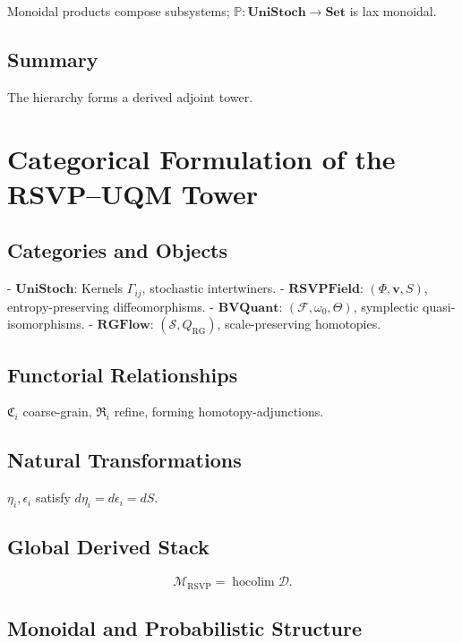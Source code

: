 \documentclass[12pt]{article}
\begin{document}
Monoidal products compose subsystems; \(\mathbb{P}: \mathbf{UniStoch} \to \mathbf{Set}\) is lax monoidal.

\subsection{Summary}

The hierarchy forms a derived adjoint tower.

\section{Categorical Formulation of the RSVP–UQM Tower}
\label{app:categorical-tower}

\subsection{Categories and Objects}

- \(\mathbf{UniStoch}\): Kernels \(\Gamma_{ij}\), stochastic intertwiners.
- \(\mathbf{RSVPField}\): \((\Phi, \mathbf{v}, S)\), entropy-preserving diffeomorphisms.
- \(\mathbf{BVQuant}\): \((\mathcal{F}, \omega_0, \Theta)\), symplectic quasi-isomorphisms.
- \(\mathbf{RGFlow}\): \((\mathcal{S}, Q_{\mathrm{RG}})\), scale-preserving homotopies.

\subsection{Functorial Relationships}

\(\mathfrak{C}_i\) coarse-grain, \(\mathfrak{R}_i\) refine, forming homotopy-adjunctions.

\subsection{Natural Transformations}

\(\eta_i, \epsilon_i\) satisfy \(d \eta_i = d \epsilon_i = dS\).

\subsection{Global Derived Stack}

\[
\mathcal{M}_{\mathrm{RSVP}} = \operatorname{hocolim} \mathcal{D}.
\]

\subsection{Monoidal and Probabilistic Structure}
\end{document}
